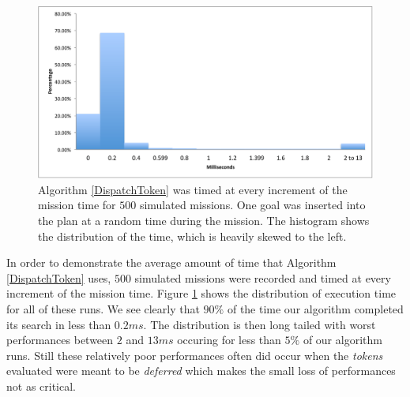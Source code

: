 \begin{figure}[!htbp]
  \centering
  \includegraphics[width=\columnwidth]{figs/HistogramAlg1}
  \caption{\small Algorithm \ref{DispatchToken} was 
  timed at every increment of the mission time for $500$ 
  simulated missions. One goal was inserted into the plan 
  at a random time during the mission. The histogram shows 
  the distribution of the time, which is heavily skewed to the left.}
  \label{fig:histogram}
\end{figure}

In order to demonstrate the average amount of time that Algorithm
\ref{DispatchToken} uses, $500$ simulated missions were recorded and
timed at every increment of the mission time. Figure
\ref{fig:histogram} shows the distribution of execution time for all
of these runs. We see clearly that $90\%$ of the time our algorithm
completed its search in less than $0.2 ms$. The distribution is
then long tailed with worst performances between $2$ and $13ms$
occuring for less than $5\%$ of our algorithm runs. Still these
relatively poor performances often did occur when the {\em tokens}
evaluated were meant to be {\em deferred} which makes the small loss
of performances not as critical.



